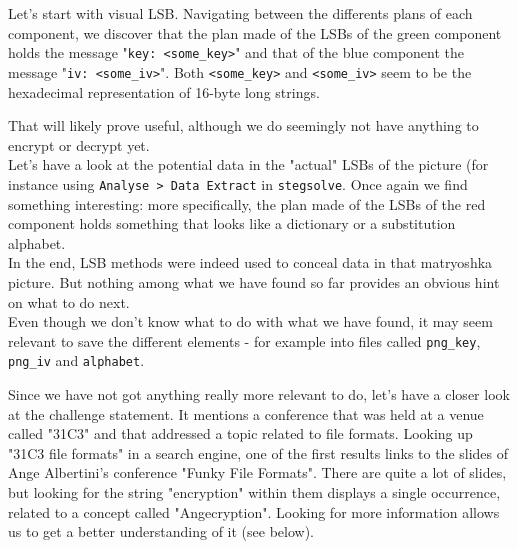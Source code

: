 \documentclass[12pt,a4paper]{article}
\begin{document}
    Let's start with visual LSB. Navigating between the differents plans of each component, we discover that the plan made of the LSBs of the green component holds the message "\texttt{key: <some\_key>}" and that of the blue component the message "\texttt{iv: <some\_iv>}". Both \texttt{<some\_key>} and \texttt{<some\_iv>} seem to be the hexadecimal representation of 16-byte long strings.


    That will likely prove useful, although we do seemingly not have anything to
    encrypt or decrypt yet.\\

    Let's have a look at the potential data in the "actual" LSBs of the picture
    (for instance using \texttt{Analyse > Data Extract} in \texttt{stegsolve}.
    Once again we find something interesting: more specifically, the plan made
    of the LSBs of the red component holds something that looks like a
    dictionary or a substitution alphabet.\\


    In the end, LSB methods were indeed used to conceal data in that matryoshka
    picture.  But nothing among what we have found so far provides an obvious
    hint on what to do next.\\

    Even though we don't know what to do with what we have found, it may seem
    relevant to save the different elements - for example into files called
    \texttt{png\_key}, \texttt{png\_iv} and \texttt{alphabet}.

    Since we have not got anything really more relevant to do, let's have a
    closer look at the challenge statement. It mentions a conference that was
    held at a venue called "31C3" and that addressed a topic related to file
    formats. Looking up "31C3 file formats" in a search engine, one of the
    first results links to the slides of Ange Albertini's conference "Funky
    File Formats". There are quite a lot of slides, but looking for the string
    "encryption" within them displays a single occurrence, related to a concept
    called "Angecryption". Looking for more information allows us to get a
    better understanding of it (see below).
\end{document}
